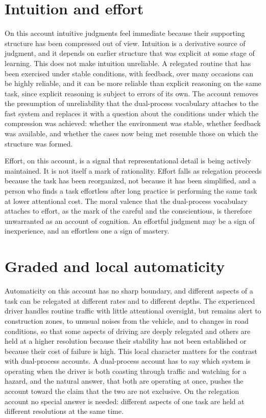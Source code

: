 \documentclass[11pt]{report}
\theoremstyle{remark}
\theoremstyle{definition}
\begin{document}
\section{Intuition and effort}

On this account intuitive judgments feel immediate because their supporting structure has been compressed out of view. Intuition is a derivative source of judgment, and it depends on earlier structure that was explicit at some stage of learning. This does not make intuition unreliable. A relegated routine that has been exercised under stable conditions, with feedback, over many occasions can be highly reliable, and it can be more reliable than explicit reasoning on the same task, since explicit reasoning is subject to errors of its own. The account removes the presumption of unreliability that the dual-process vocabulary attaches to the fast system and replaces it with a question about the conditions under which the compression was achieved: whether the environment was stable, whether feedback was available, and whether the cases now being met resemble those on which the structure was formed.

Effort, on this account, is a signal that representational detail is being actively maintained. It is not itself a mark of rationality. Effort falls as relegation proceeds because the task has been reorganized, not because it has been simplified, and a person who finds a task effortless after long practice is performing the same task at lower attentional cost. The moral valence that the dual-process vocabulary attaches to effort, as the mark of the careful and the conscientious, is therefore unwarranted as an account of cognition. An effortful judgment may be a sign of inexperience, and an effortless one a sign of mastery.

\section{Graded and local automaticity}

Automaticity on this account has no sharp boundary, and different aspects of a task can be relegated at different rates and to different depths. The experienced driver handles routine traffic with little attentional oversight, but remains alert to construction zones, to unusual noises from the vehicle, and to changes in road conditions, so that some aspects of driving are deeply relegated and others are held at a higher resolution because their stability has not been established or because their cost of failure is high. This local character matters for the contrast with dual-process accounts. A dual-process account has to say which system is operating when the driver is both coasting through traffic and watching for a hazard, and the natural answer, that both are operating at once, pushes the account toward the claim that the two are not exclusive. On the relegation account no special answer is needed: different aspects of one task are held at different resolutions at the same time.
\end{document}
